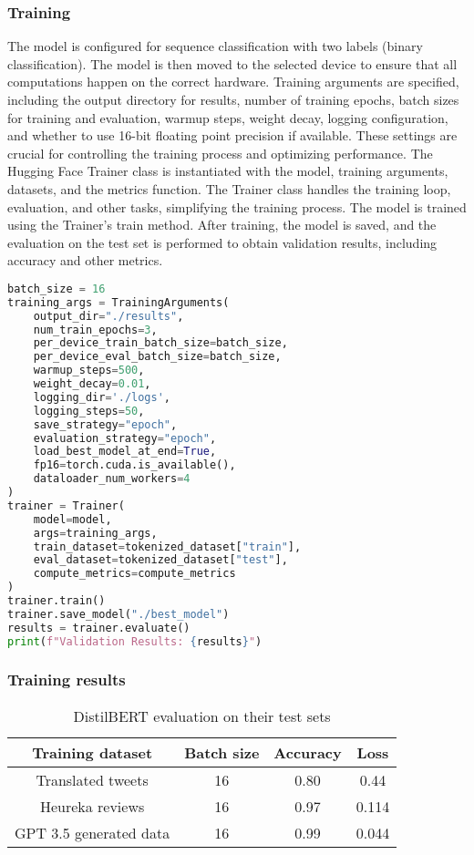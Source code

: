 \documentclass[11pt]{article}
\begin{document}
\subsubsection{Training}
The model is configured for sequence classification with two labels (binary classification). The model is then moved to the selected device to ensure that all computations happen on the correct hardware.
Training arguments are specified, including the output directory for results, number of training epochs, batch sizes for training and evaluation, warmup steps, weight decay, logging configuration, and whether to use 16-bit floating point precision if available. These settings are crucial for controlling the training process and optimizing performance.
The Hugging Face Trainer class is instantiated with the model, training arguments, datasets, and the metrics function. The Trainer class handles the training loop, evaluation, and other tasks, simplifying the training process.
The model is trained using the Trainer's train method. After training, the model is saved, and the evaluation on the test set is performed to obtain validation results, including accuracy and other metrics.

\begin{lstlisting}[language=Python, caption=Code for setting up and training the model]
batch_size = 16
training_args = TrainingArguments(
    output_dir="./results",
    num_train_epochs=3,
    per_device_train_batch_size=batch_size,
    per_device_eval_batch_size=batch_size,
    warmup_steps=500,
    weight_decay=0.01,
    logging_dir='./logs',
    logging_steps=50,
    save_strategy="epoch",
    evaluation_strategy="epoch",
    load_best_model_at_end=True,
    fp16=torch.cuda.is_available(),
    dataloader_num_workers=4
)
trainer = Trainer(
    model=model,
    args=training_args,
    train_dataset=tokenized_dataset["train"],
    eval_dataset=tokenized_dataset["test"],
    compute_metrics=compute_metrics
)
trainer.train()
trainer.save_model("./best_model")
results = trainer.evaluate()
print(f"Validation Results: {results}")
\end{lstlisting}

\subsubsection{Training results}

\begin{table}[h!]
    \centering
    \begin{tabular}{|c|c|c|c|} %
        \hline
        \textbf{Training dataset} & \textbf{Batch size} & \textbf{Accuracy} & \textbf{Loss} \\
        \hline
        Translated tweets & 16 & 0.80 & 0.44 \\
        \hline
        Heureka reviews & 16 & 0.97 & 0.114 \\
        \hline
        GPT 3.5 generated data & 16 & 0.99 & 0.044 \\
        \hline
    \end{tabular}
    \caption{DistilBERT evaluation on their test sets}
    \label{tab:lstm_train_eval}
\end{table}
\end{document}
